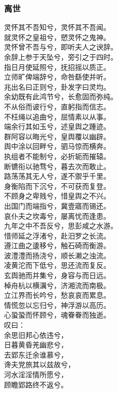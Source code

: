 \documentclass[]{article}
\begin{document}
\hypertarget{header-n3087}{%
\subsubsection{离世}\label{header-n3087}}

灵怀其不吾知兮，灵怀其不吾闻。\\
就灵怀之皇祖兮，愬灵怀之鬼神。\\
灵怀曾不吾与兮，即听夫人之谀辞。\\
余辞上参于天坠兮，旁引之于四时。\\
指日月使延照兮，抚招摇以质正。\\
立师旷俾端辞兮，命咎繇使并听。\\
兆出名曰正则兮，卦发字曰灵均。\\
余幼既有此鸿节兮，长愈固而弥纯。\\
不从俗而诐行兮，直躬指而信志。\\
不枉绳以追曲兮，屈情素以从事。\\
端余行其如玉兮，述皇舆之踵迹。\\
群阿容以晦光兮，皇舆覆以幽辟。\\
舆中涂以回畔兮，驷马惊而横奔。\\
执组者不能制兮，必折轭而摧辕。\\
断镳衔以驰骛兮，暮去次而敢止。\\
路荡荡其无人兮，遂不禦乎千里。\\
身衡陷而下沉兮，不可获而复登。\\
不顾身之卑贱兮，惜皇舆之不兴。\\
出国门而端指兮，冀壹寤而锡还。\\
哀仆夫之坎毒兮，屡离忧而逢患。\\
九年之中不吾反兮，思彭咸之水游。\\
惜师延之浮渚兮，赴汨罗之长流。\\
遵江曲之逶移兮，触石碕而衡游。\\
波澧澧而扬浇兮，顺长濑之浊流。\\
凌黄沱而下低兮，思还流而复反。\\
玄舆驰而并集兮，身容与而日远。\\
棹舟杭以横濿兮，济湘流而南极。\\
立江界而长吟兮，愁哀哀而累息。\\
情慌忽以忘归兮，神浮游以高历。\\
心蛩蛩而怀顾兮，魂眷眷而独逝。\\
叹曰：\\
余思旧邦心依违兮，\\
日暮黄昏羌幽悲兮，\\
去郢东迁余谁慕兮，\\
谗夫党旅其以兹故兮，\\
河水淫淫情所愿兮，\\
顾瞻郢路终不返兮。
\end{document}
